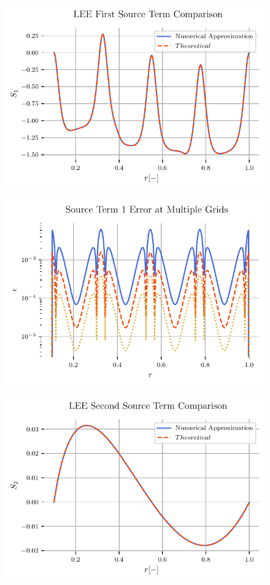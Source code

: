 \documentclass{article}
\begin{document}
\begin{figure}
    \centering
    \includegraphics[width=\textwidth]{tex-outputs/SourceTermComparison1.pdf}
\end{figure}

\begin{figure}
    \centering
    \includegraphics[width=\textwidth]{tex-outputs/SourceTermError1.pdf}
\end{figure}


\begin{figure}
    \centering
    \includegraphics[width=\textwidth]{tex-outputs/SourceTermComparison2.pdf}
\end{figure}
\end{document}
